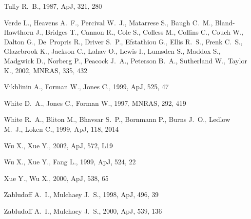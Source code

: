 \documentclass[usenatbib]{mn2e}
\begin{document}
\begin{thebibliography}{}
Tully R.~B.,  1987, ApJ, 321, 280

  Verde L.,  Heavens A.~F.,  Percival W.~J.,  Matarrese S.,  Baugh C.~M.,
  Bland-Hawthorn J.,  Bridges T.,  Cannon R.,  Cole S.,  Colless M.,  Collins
  C.,  Couch W.,  Dalton G.,  De~Propris R.,  Driver S.~P.,  Efstathiou G.,
  Ellis R.~S.,  Frenk C.~S.,  Glazebrook K.,  Jackson C.,  Lahav O.,    Lewis
  I.,  Lumsden S.,  Maddox S.,  Madgwick D.,  Norberg P.,  Peacock J.~A.,
  Peterson B.~A.,  Sutherland W.,  Taylor K.,  2002, MNRAS, 335, 432

Vikhlinin A.,  Forman W.,    Jones C.,  1999, ApJ, 525, 47

White D.~A.,  Jones C.,    Forman W.,  1997, MNRAS, 292, 419

White R.~A.,  Bliton M.,  Bhavsar S.~P.,  Bornmann P.,  Burns J.~O.,  Ledlow
  M.~J.,    Loken C.,  1999, ApJ, 118, 2014

Wu X.,  Xue Y.,  2002, ApJ, 572, L19

Wu X.,  Xue Y.,    Fang L.,  1999, ApJ, 524, 22

Xue Y.,  Wu X.,  2000, ApJ, 538, 65

Zabludoff A.~I.,  Mulchaey J.~S.,  1998, ApJ, 496, 39

Zabludoff A.~I.,  Mulchaey J.~S.,  2000, ApJ, 539, 136

\end{thebibliography}


\label{lastpage}
\end{document}
